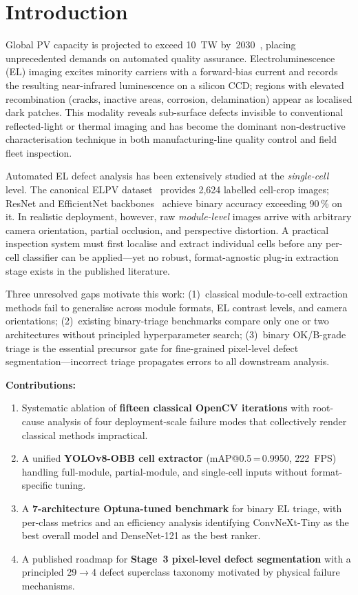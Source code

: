 \documentclass[conference]{IEEEtran}
\begin{document}
\section{Introduction}

Global PV capacity is projected to exceed 10~TW by~2030~\cite{iea2023}, placing unprecedented demands on automated quality assurance. Electroluminescence (EL) imaging excites minority carriers with a forward-bias current and records the resulting near-infrared luminescence on a silicon CCD; regions with elevated recombination (cracks, inactive areas, corrosion, delamination) appear as localised dark patches. This modality reveals sub-surface defects invisible to conventional reflected-light or thermal imaging and has become the dominant non-destructive characterisation technique in both manufacturing-line quality control and field fleet inspection.

Automated EL defect analysis has been extensively studied at the \textit{single-cell} level. The canonical ELPV dataset~\cite{deitsch2019} provides 2{,}624 labelled cell-crop images; ResNet and EfficientNet backbones~\cite{he2016,tan2019} achieve binary accuracy exceeding 90\,\% on it. In realistic deployment, however, raw \textit{module-level} images arrive with arbitrary camera orientation, partial occlusion, and perspective distortion. A practical inspection system must first localise and extract individual cells before any per-cell classifier can be applied---yet no robust, format-agnostic plug-in extraction stage exists in the published literature.

Three unresolved gaps motivate this work: (1)~classical module-to-cell extraction methods fail to generalise across module formats, EL contrast levels, and camera orientations; (2)~existing binary-triage benchmarks compare only one or two architectures without principled hyperparameter search; (3)~binary OK/B-grade triage is the essential precursor gate for fine-grained pixel-level defect segmentation---incorrect triage propagates errors to all downstream analysis.

\textbf{Contributions:}
\begin{enumerate}
  \item Systematic ablation of \textbf{fifteen classical OpenCV iterations} with root-cause analysis of four deployment-scale failure modes that collectively render classical methods impractical.
  \item A unified \textbf{YOLOv8-OBB cell extractor} (mAP@0.5\,=\,0.9950, 222~FPS) handling full-module, partial-module, and single-cell inputs without format-specific tuning.
  \item A \textbf{7-architecture Optuna-tuned benchmark} for binary EL triage, with per-class metrics and an efficiency analysis identifying ConvNeXt-Tiny as the best overall model and DenseNet-121 as the best ranker.
  \item A published roadmap for \textbf{Stage~3 pixel-level defect segmentation} with a principled 29$\to$4 defect superclass taxonomy motivated by physical failure mechanisms.
\end{enumerate}
\end{document}
